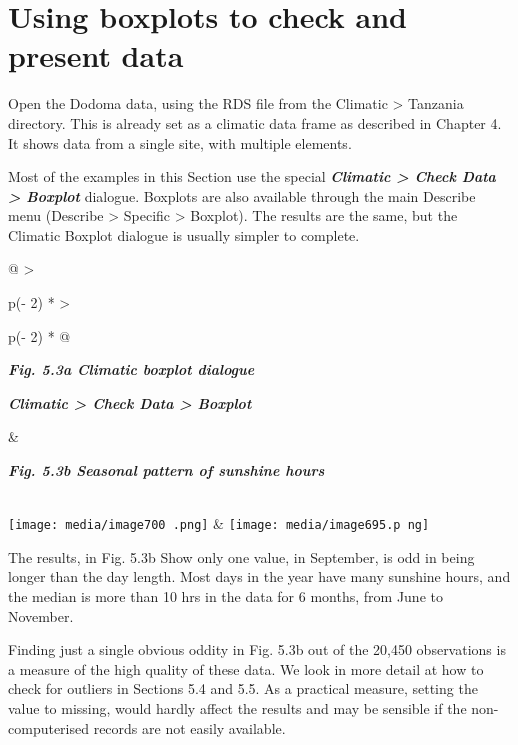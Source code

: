 \documentclass[
  letterpaper,
  DIV=11,
  numbers=noendperiod]{scrreprt}
\begin{document}
\section{Using boxplots to check and present
data}\label{using-boxplots-to-check-and-present-data}

Open the Dodoma data, using the RDS file from the Climatic
\textgreater{} Tanzania directory. This is already set as a climatic
data frame as described in Chapter 4. It shows data from a single site,
with multiple elements.

Most of the examples in this Section use the special
\textbf{\emph{Climatic \textgreater{} Check Data \textgreater{}
Boxplot}} dialogue. Boxplots are also available through the main
Describe menu (Describe \textgreater{} Specific \textgreater{} Boxplot).
The results are the same, but the Climatic Boxplot dialogue is usually
simpler to complete.

\begin{longtable}[]{@{}
  >{\raggedright\arraybackslash}p{(\columnwidth - 2\tabcolsep) * }
  >{\raggedright\arraybackslash}p{(\columnwidth - 2\tabcolsep) * }@{}}
\toprule\noalign{}
\begin{minipage}[b]{\linewidth}\raggedright
\textbf{\emph{Fig. 5.3a Climatic boxplot dialogue}}

\textbf{\emph{Climatic \textgreater{} Check Data \textgreater{}
Boxplot}}
\end{minipage} & \begin{minipage}[b]{\linewidth}\raggedright
\textbf{\emph{Fig. 5.3b Seasonal pattern of sunshine hours}}
\end{minipage} \\
\midrule\noalign{}
\endhead
\bottomrule\noalign{}
\endlastfoot
\texttt{[image: media/image700 .png]}
&
\texttt{[image: media/image695.p ng]} \\
\end{longtable}

The results, in Fig. 5.3b Show only one value, in September, is odd in
being longer than the day length. Most days in the year have many
sunshine hours, and the median is more than 10 hrs in the data for 6
months, from June to November.

Finding just a single obvious oddity in Fig. 5.3b out of the 20,450
observations is a measure of the high quality of these data. We look in
more detail at how to check for outliers in Sections 5.4 and 5.5. As a
practical measure, setting the value to missing, would hardly affect the
results and may be sensible if the non-computerised records are not
easily available.
\end{document}
